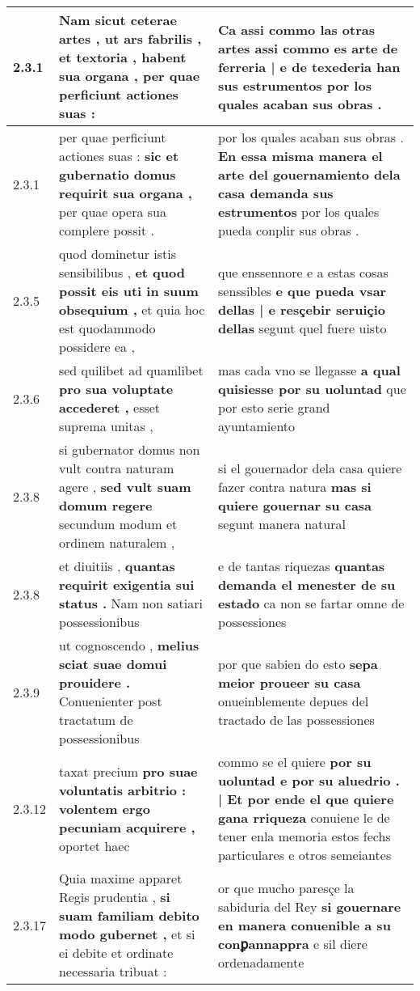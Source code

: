 \begin{tabular}{|p{1cm}|p{6.5cm}|p{6.5cm}|}
2.3.1 & Nam sicut ceterae artes , \textbf{ ut ars fabrilis , et textoria , habent sua organa , } per quae perficiunt actiones suas : & Ca assi commo las otras artes \textbf{ assi commo es arte de ferreria | e de texederia han sus estrumentos } por los quales acaban sus obras . \\\hline
2.3.1 & per quae perficiunt actiones suas : \textbf{ sic et gubernatio domus requirit sua organa , } per quae opera sua complere possit . & por los quales acaban sus obras . \textbf{ En essa misma manera el arte del gouernamiento dela casa demanda sus estrumentos } por los quales pueda conplir sus obras . \\\hline
2.3.5 & quod dominetur istis sensibilibus , \textbf{ et quod possit eis uti in suum obsequium , } et quia hoc est quodammodo possidere ea , & que enssennore e a estas cosas senssibles \textbf{ e que pueda vsar dellas | e resçebir seruiçio dellas } segunt quel fuere uisto \\\hline
2.3.6 & sed quilibet ad quamlibet \textbf{ pro sua voluptate accederet , } esset suprema unitas , & mas cada vno se llegasse \textbf{ a qual quisiesse por su uoluntad } que por esto serie grand ayuntamiento \\\hline
2.3.8 & si gubernator domus non vult contra naturam agere , \textbf{ sed vult suam domum regere } secundum modum et ordinem naturalem , & si el gouernador dela casa quiere fazer contra natura \textbf{ mas si quiere gouernar su casa } segunt manera natural \\\hline
2.3.8 & et diuitiis , \textbf{ quantas requirit exigentia sui status . } Nam non satiari possessionibus & e de tantas riquezas \textbf{ quantas demanda el menester de su estado } ca non se fartar omne de possessiones \\\hline
2.3.9 & ut cognoscendo , \textbf{ melius sciat suae domui prouidere . } Conuenienter post tractatum de possessionibus & por que sabien do esto \textbf{ sepa meior proueer su casa } onueinblemente depues del tractado de las possessiones \\\hline
2.3.12 & taxat precium \textbf{ pro suae voluntatis arbitrio : volentem ergo pecuniam acquirere , } oportet haec & commo se el quiere \textbf{ por su uoluntad e por su aluedrio . | Et por ende el que quiere gana rriqueza } conuiene le de tener enla memoria estos fechs particulares e otros semeiantes \\\hline
2.3.17 & Quia maxime apparet Regis prudentia , \textbf{ si suam familiam debito modo gubernet , } et si ei debite et ordinate necessaria tribuat : & or que mucho paresçe la sabiduria del Rey \textbf{ si gouernare en manera conuenible a su conꝑannappra } e sil diere ordenadamente \\\hline

\end{tabular}
